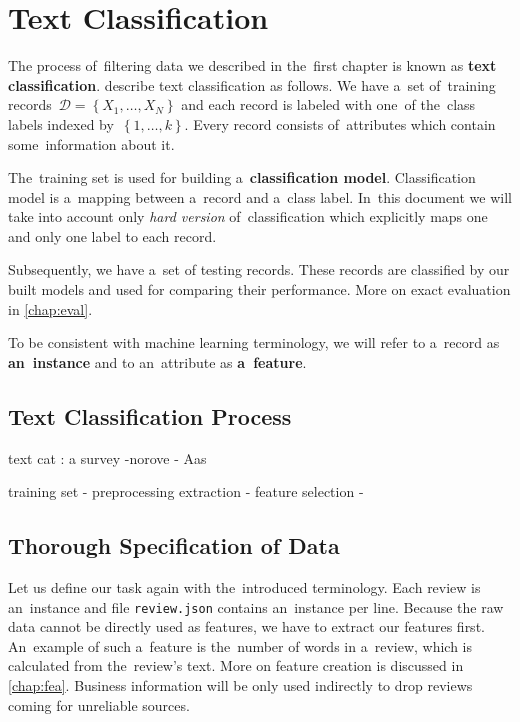 \chapter{Text Classification}

The process of~filtering data we described in the~first chapter is known as {\bf text classification}.
\citet{AggZhai12} describe text classification as follows.
We have a~set of~training records~$\mathcal{D} = \left\{X_1, \ldots, X_N\right\}$ and each record is labeled with one~of the~class labels indexed by~$\left\{1,\ldots, k\right\}$.
Every record consists of~attributes which contain some~information about it.

The~training set is used for building a~{\bf classification model}. Classification model is a~mapping between a~record and a~class label.
In~this document we will take into account only \emph{hard version} of~classification which explicitly maps one and only one label to each record.  


Subsequently, we have a~set of testing records.
These records are classified by our built models and used for comparing their performance.
More on exact evaluation in \autoref{chap:eval}.

To be consistent with machine learning terminology, we will refer to a~record as {\bf an~instance} and to an~attribute as {\bf a~feature}.

\section{Text Classification Process}


text cat : a survey -norove - Aas

training set -\> preprocessing {extraction} -\> feature selection -\> 

\citet{Song14} 

\section{Thorough Specification of Data}

Let us define our task again with the~introduced terminology.
Each review is an~instance and file \texttt{review.json} contains an~instance per line.
Because the raw data cannot be directly used as features, we have to extract our features first.
An~example of such a~feature is the~number of words in a~review, which is calculated from the~review's text.
More on feature creation is discussed in \autoref{chap:fea}.
Business information will be only used indirectly to drop reviews coming for unreliable sources.

